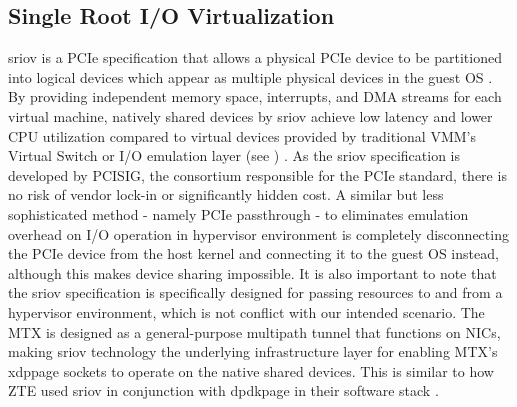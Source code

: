 \subsection{Single Root I/O Virtualization}
\ac{sriov} is a \ac{PCIe} specification that allows a physical \ac{PCIe} device to be partitioned into logical devices which appear as multiple physical devices in the guest \ac{OS} \cite{ibm_sriov}\cite{vmware_sriov}. 
By providing independent memory space, interrupts, and \ac{DMA} streams for each virtual machine, natively shared devices by \ac{sriov} achieve low latency and lower CPU utilization compared to virtual devices provided by traditional \ac{VMM}'s Virtual Switch or  I/O emulation layer (see ) \cite{intel_sriov}.
As the \ac{sriov} specification is developed by \ac{PCISIG}, the consortium responsible for the \ac{PCIe} standard, there is no risk of vendor lock-in or significantly hidden cost.
A similar but less sophisticated method - namely \ac{PCIe} passthrough - to eliminates emulation overhead on I/O operation in hypervisor environment is completely disconnecting the \ac{PCIe} device from the host kernel and connecting it to the guest \ac{OS} instead, although this makes device sharing impossible.
It is also important to note that the \ac{sriov} specification is specifically designed for passing resources to and from a hypervisor environment, which is not conflict with our intended scenario.
The \ac{MTX} is designed as a general-purpose multipath tunnel that functions on \ac{NIC}s, making \ac{sriov} technology the underlying infrastructure layer for enabling \ac{MTX}'s \ac{xdppage} sockets to operate on the native shared devices.
This is similar to how \ac{ZTE} used \ac{sriov} in conjunction with \ac{dpdkpage} in their software stack \cite{zte_upf_full_whitepaper}.

